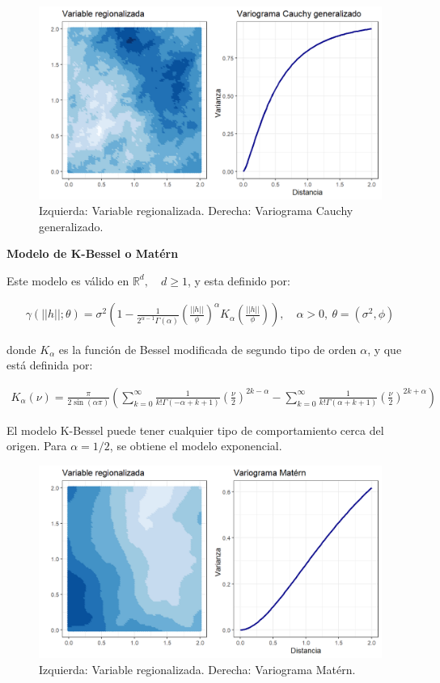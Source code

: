 \documentclass[
]{book}
\begin{document}
\begin{figure}
\includegraphics[width=17.78in]{figuras/otros/caugen_var} \caption{Izquierda: Variable regionalizada. Derecha: Variograma Cauchy generalizado.}\label{fig:caugenvar}
\end{figure}

\textbf{Modelo de K-Bessel o Matérn}

Este modelo es válido en \(\mathbb{R}^d,\quad d \geq 1\), y esta definido por:

\begin{align*}
    \gamma(||h||;\theta)=\sigma^2\left(1-\frac{1}{2^{\alpha-1}\Gamma(\alpha)}\left(\frac{||h||}{\phi} \right)^\alpha K_\alpha \left(\frac{||h||}{\phi} \right) \right),\quad \alpha>0,\ \theta=(\sigma^2,\phi)
\end{align*}

donde \(K_\alpha\) es la función de Bessel modificada de segundo tipo de orden \(\alpha\), y que está definida por:

\begin{align*}
    K_\alpha (\nu) =\frac{\pi}{2\sin(\alpha \pi)}\left(\sum_{k=0}^\infty {\frac{1}{k!\Gamma(-\alpha+k+1)}\left(\frac{\nu}{2}\right)^{2k-\alpha}}-\sum_{k=0}^\infty {\frac{1}{k!\Gamma(\alpha+k+1)}\left(\frac{\nu}{2}\right)^{2k+\alpha}}\right)
\end{align*}

El modelo K-Bessel puede tener cualquier tipo de comportamiento cerca del origen. Para \(\alpha=1/2\), se obtiene el modelo exponencial.

\begin{figure}
\includegraphics[width=17.78in]{figuras/otros/mat_var} \caption{Izquierda: Variable regionalizada. Derecha: Variograma Matérn.}\label{fig:matvar}
\end{figure}
\end{document}

